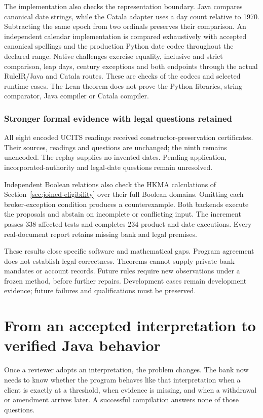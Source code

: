 \documentclass[12pt,a4paper,oneside,openany]{book}
\begin{document}
The implementation also checks the representation boundary. Java compares
canonical date strings, while the Catala adapter uses a day count relative to
1970. Subtracting the same epoch from two ordinals preserves their comparison.
An independent calendar implementation is compared exhaustively with accepted
canonical spellings and the production Python date codec throughout the
declared range. Native challenges exercise equality, inclusive and strict
comparison, leap days, century exceptions and both endpoints through the
actual RuleIR/Java and Catala routes. These are checks of the codecs and
selected runtime cases. The Lean theorem does not prove the Python libraries,
string comparator, Java compiler or Catala compiler.

\subsection{Stronger formal evidence with legal questions retained}

All eight encoded UCITS readings received constructor-preservation certificates.
Their sources, readings and questions are unchanged; the ninth remains
unencoded. The replay supplies no invented dates. Pending-application,
incorporated-authority and legal-date questions remain unresolved.

Independent Boolean relations also check the HKMA calculations of
Section~\ref{sec:joined-eligibility} over their full Boolean domains. Omitting
each broker-exception condition produces a counterexample. Both backends
execute the proposals and abstain on incomplete or conflicting input. The
increment passes 338 affected tests and completes 234 product and date
executions. Every real-document report retains missing bank and legal premises.

These results close specific software and mathematical gaps. Program agreement
does not establish legal correctness. Theorems cannot supply private bank
mandates or account records. Future rules require new observations under a
frozen method, before further repairs. Development cases remain development
evidence; future failures and qualifications must be preserved.

\chapter{From an accepted interpretation to verified Java behavior}
\label{ch:verification}

Once a reviewer adopts an interpretation, the problem changes. The bank now
needs to know whether the program behaves like that interpretation when a client
is exactly at a threshold, when evidence is missing, and when a withdrawal or
amendment arrives later. A successful compilation answers none of those
questions.
\end{document}
